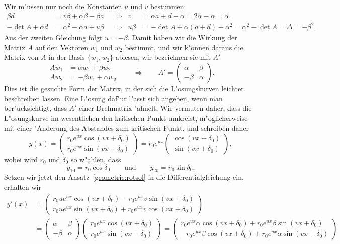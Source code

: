 Wir m"ussen nur noch die Konstanten $u$ und $v$ bestimmen:
\begin{align*}
\beta d
&=
v\beta
+
\alpha\beta
-
\beta a
&&\Rightarrow&
v
&=
\alpha a+d-\alpha=2\alpha-\alpha=\alpha,
\\
-\det A +\alpha d
&=
\alpha^2- \alpha a+u\beta
&&\Rightarrow&
u\beta&=-\det A +\alpha(a+d)-\alpha^2
=\alpha^2-\det A
=\Delta=-\beta^2.
\end{align*}
Aus der zweiten Gleichung folgt $ u=-\beta$.
Damit haben wir die Wirkung der Matrix $A$ auf den Vektoren $w_1$ und $w_2$
bestimmt, und wir k"onnen daraus die Matrix von $A$ in der Basis
$\{w_1,w_2\}$ ablesen, wir bezeichnen sie mit $A'$
\[
\begin{aligned}
Aw_1&=\alpha w_1 + \beta w_2\\
Aw_2&=-\beta w_1 + \alpha w_2
\end{aligned}
\qquad\Rightarrow\qquad
A'=\begin{pmatrix}
\alpha&\beta\\
-\beta&\alpha
\end{pmatrix}.
\]
Dies ist die gesuchte Form der Matrix, in der sich die L"osungskurven
leichter beschreiben lassen.
Eine L"osung daf"ur l"asst sich angeben, wenn man ber"ucksichtigt, dass
$A'$ einer Drehmatrix "ahnelt.
%
Wir vermuten daher, dass die L"osungskurve im wesentlichen den kritischen
Punkt umkreist, m"oglicherweise mit einer "Anderung des Abstandes
zum kritischen Punkt, und schreiben daher
\begin{equation}
y(x)
=
\begin{pmatrix}
r_0e^{ux}\cos(vx+\delta_0)\\
r_0e^{ux}\sin(vx+\delta_0)
\end{pmatrix}
=
r_0e^{ux}
\begin{pmatrix}
\cos(vx+\delta_0)\\
\sin(vx+\delta_0)
\end{pmatrix}
,
\label{geometrie:rotsol}
\end{equation}
wobei wird $r_0$ und $\delta_0$ so w"ahlen, dass
\[
y_{10}=r_0\cos\delta_0
\qquad\text{und}\qquad
y_{20}=r_0\sin\delta_0.
\]
Setzen wir jetzt den Ansatz~\eqref{geometrie:rotsol} in die
Differentialgleichung ein, erhalten wir
\begin{align*}
y'(x)
&=
\begin{pmatrix}
r_0ue^{ux}\cos(vx+\delta_0)-r_0e^{ux}v\sin(vx+\delta_0)\\
r_0ue^{ux}\sin(vx+\delta_0)+r_0e^{ux}v\cos(vx+\delta_0)
\end{pmatrix}
\\
&=
\begin{pmatrix}
 \alpha&\beta\\
-\beta &\alpha
\end{pmatrix}
\begin{pmatrix}
r_0e^{ux}\cos(vx+\delta_0)\\
r_0e^{ux}\sin(vx+\delta_0)
\end{pmatrix}
=
\begin{pmatrix}
r_0e^{ux}\alpha\cos(vx+\delta_0)+r_0e^{ux}\beta\sin(vx +\delta_0)\\
-r_0e^{ux}\beta\cos(vx+\delta_0)+r_0e^{ux}\alpha\sin(vx+\delta_0)
\end{pmatrix}
\end{align*}

